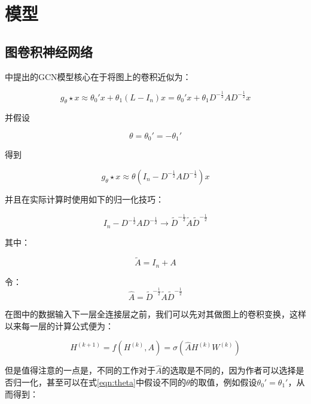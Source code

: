 \documentclass[color=gray,base=hide,cn]{elegantbook}
\begin{document}
\part{模型}

\chapter{图卷积神经网络}

\cite{kipf2016semi}中提出的GCN模型核心在于将图上的卷积近似为：

\begin{equation}
g_\theta \star x \approx \theta_0'x + \theta_1 (L-I_n)x =  \theta_0'x + \theta_1 D^{-\frac{1}{2}} A D^{-\frac{1}{2}} x
\end{equation}

并假设

\begin{equation}
\theta = \theta_0' = -\theta_1' 
\label{eqn:theta}
\end{equation}

得到

\begin{equation}
g_\theta \star x \approx \theta\left (I_n - D^{-\frac{1}{2}} A D^{-\frac{1}{2}} \right) x
\end{equation}

并且在实际计算时使用如下的归一化技巧：

\begin{equation}
I_n - D^{-\frac{1}{2}} A D^{-\frac{1}{2}} \rightarrow \tilde{D}^{-\frac{1}{2}} \tilde{A} \tilde{D}^{-\frac{1}{2}}  
\end{equation}

其中：

\begin{equation}
\tilde{A} = I_n + A
\end{equation}

令：
\begin{equation}
    \hat{A} = \tilde{D}^{-\frac{1}{2}}\tilde{A}\tilde{D}^{-\frac{1}{2}}
\end{equation}

在图中的数据输入下一层全连接层之前，我们可以先对其做图上的卷积变换，这样以来每一层的计算公式便为：

\begin{equation}
{H}^{(k+1)} = f(H^{(k)}, A) = \sigma\left(\hat{A} H^{(k)}W^{(k)}\right)
\end{equation}

但是值得注意的一点是，不同的工作对于$\hat{A}$的选取是不同的，因为作者可以选择是否归一化，甚至可以在式\ref{eqn:theta}中假设不同的$\theta$的取值，例如假设$\theta_0' = \theta_1' $，从而得到：
\end{document}
